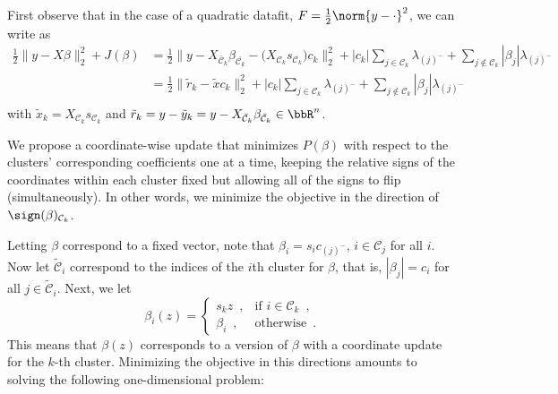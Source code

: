 First observe that in the case of a quadratic datafit, $F = \frac{1}{2} \norm{y - \cdot}^2$, we can write  as
\[
  \begin{aligned}
     \frac{1}{2} \lVert y - X\beta\rVert_2^2 + J(\beta)                        %
     & = \frac{1}{2} \lVert y - X_{\bar{\mathcal{C}}_k} \beta_{\bar{\mathcal{C}_k}}
    - \big(X_{\mathcal{C}_k} s_{\mathcal{C}_k}\big)c_k  \rVert_2^2
    + |c_k|\sum_{j \in {\mathcal{C}_k}} \lambda_{(j)^-}
    + \sum_{j \notin {\mathcal{C}_k}} |\beta_j|\lambda_{(j)^-}                      \\
     & = \frac{1}{2} \lVert \tilde r_k - \tilde x c_k \rVert_2^2
    + |c_k|\sum_{j \in {\mathcal{C}_k}} \lambda_{(j)^-}
    + \sum_{j \notin {\mathcal{C}_k}} |\beta_j|\lambda_{(j)^-}                      \\
  \end{aligned}
\]
with \( \tilde x_k = X_{\mathcal{C}_k} s_{\mathcal{C}_k}\) and
\(\tilde r_k = y - \tilde y_k = y - X_{\bar{\mathcal{C}}_k} \beta_{\bar{\mathcal{C}}_k} \in \bbR^n\).


We propose a coordinate-wise update that minimizes \(P(\beta)\) with respect to the
clusters' corresponding coefficients one at a time, keeping the relative signs
of the coordinates within each cluster fixed but allowing all of the signs to
flip (simultaneously).
In other words, we minimize the objective in the direction of $\sign (\beta)_{\mathcal{C}_k}$.

Letting \(\beta\) correspond to a fixed vector, note that
\(\beta_i = s_i c_{(j)^-}\), \(i \in \mathcal{C}_j\) for all
\(i\). Now let \(\tilde{\mathcal{C}}_i\)
correspond to the indices of the \(i\)th cluster for \(\beta\), that is,
\(|\beta_j| = c_i\) for all \(j \in \tilde{\mathcal{C}}_i\).
Next, we let
\begin{equation}
  \label{eq:coordinate-update-beta}
  \beta_i(z) =
  \begin{cases}
    s_k z   \enspace, & \text{if } i \in \mathcal{C}_k \enspace, \\
    \beta_i \enspace, & \text{otherwise} \enspace.
  \end{cases}
\end{equation}
This means that \(\beta(z)\) corresponds to a version of \(\beta\) with a
coordinate update for the \(k\)-th cluster.
Minimizing the objective in this directions amounts to solving the following
one-dimensional problem:

